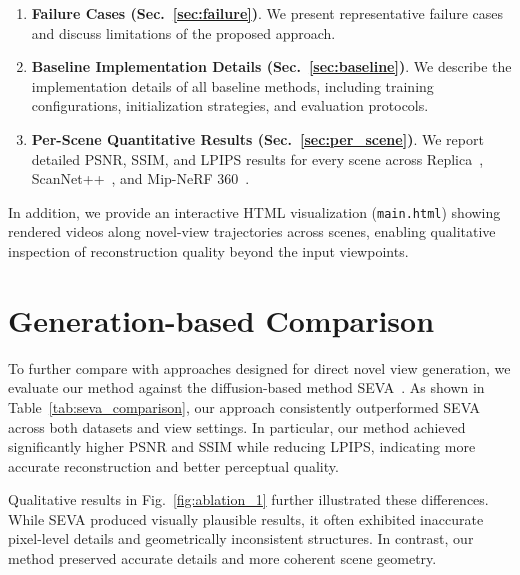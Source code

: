 \begin{enumerate}
\item \textbf{Failure Cases (Sec.~\ref{sec:failure})}. 
We present representative failure cases and discuss limitations of the proposed approach.

\item \textbf{Baseline Implementation Details (Sec.~\ref{sec:baseline})}. 
We describe the implementation details of all baseline methods, including training configurations, initialization strategies, and evaluation protocols.

\item \textbf{Per-Scene Quantitative Results (Sec.~\ref{sec:per_scene})}. 
We report detailed PSNR, SSIM, and LPIPS results for every scene across Replica~\cite{straub2019replica}, ScanNet++~\cite{yeshwanth2023scannet++}, and Mip-NeRF 360~\cite{barron2023mipnerf360}.

\end{enumerate}

In addition, we provide an interactive HTML visualization (\texttt{main.html}) showing rendered videos along novel-view trajectories across scenes, enabling qualitative inspection of reconstruction quality beyond the input viewpoints.


\section{Generation-based Comparison}
\label{sec:gen_comp}

To further compare with approaches designed for direct novel view generation, we evaluate our method against the diffusion-based method SEVA~\cite{zhou2025stable}. As shown in Table~\ref{tab:seva_comparison}, our approach consistently outperformed SEVA across both datasets and view settings. In particular, our method achieved significantly higher PSNR and SSIM while reducing LPIPS, indicating more accurate reconstruction and better perceptual quality.

Qualitative results in Fig.~\ref{fig:ablation_1} further illustrated these differences. While SEVA produced visually plausible results, it often exhibited inaccurate pixel-level details and geometrically inconsistent structures. In contrast, our method preserved accurate details and more coherent scene geometry.

\vspace{-10pt}



